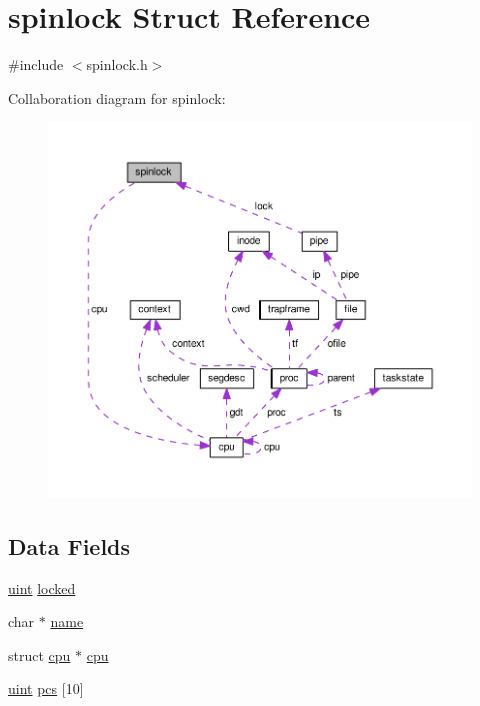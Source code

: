 \hypertarget{structspinlock}{\section{spinlock Struct Reference}
\label{structspinlock}
}


{\ttfamily \#include $<$spinlock.\-h$>$}



Collaboration diagram for spinlock\-:
\nopagebreak
\begin{figure}[H]
\begin{center}
\leavevmode
\includegraphics[width=350pt]{structspinlock__coll__graph}
\end{center}
\end{figure}
\subsection*{Data Fields}
\begin{DoxyCompactItemize}
\item 
\hyperlink{types_8h_a91ad9478d81a7aaf2593e8d9c3d06a14}{uint} \hyperlink{structspinlock_a2468e5b98a0b805a0a174eda5d09c6ad}{locked}
\item 
char $\ast$ \hyperlink{structspinlock_a5ac083a645d964373f022d03df4849c8}{name}
\item 
struct \hyperlink{structcpu}{cpu} $\ast$ \hyperlink{structspinlock_a01255252d6a6f1a4d5550f72dfe3a733}{cpu}
\item 
\hyperlink{types_8h_a91ad9478d81a7aaf2593e8d9c3d06a14}{uint} \hyperlink{structspinlock_a96a0f9277e455aac1e0f848607cb1a2d}{pcs} \mbox{[}10\mbox{]}
\end{DoxyCompactItemize}


